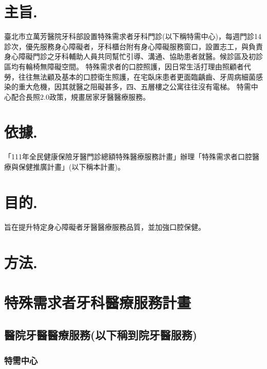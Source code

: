 \section*{主旨.}
臺北市立萬芳醫院牙科部設置特殊需求者牙科門診(以下稱特需中心)，每週門診14診次，優先服務身心障礙者，牙科櫃台附有身心障礙服務窗口，設置志工，與負責身心障礙門診之牙科輔助人員共同幫忙引導、溝通、協助患者就醫。候診區及初診區均有輪椅無障礙空間。
特殊需求者的口腔照護，因日常生活打理由照顧者代勞，往往無法顧及基本的口腔衛生照護，在宅臥床患者更面臨齲齒、牙周病細菌感染的重大危機，因其就醫之阻礙甚多，四、五層樓之公寓往往沒有電梯。
特需中心配合長照2.0政策，規畫居家牙醫醫療服務。

\section*{依據.}
「111年全民健康保險牙醫門診總額特殊醫療服務計畫」辦理「特殊需求者口腔醫療與保健推廣計畫」(以下稱本計畫)。

\section*{目的.} 旨在提升特定身心障礙者牙醫醫療服務品質，並加強口腔保健。

\section*{方法.}
\section{特殊需求者牙科醫療服務計畫}

\subsection{醫院牙醫醫療服務(以下稱到院牙醫服務)}
\label{dent}

\subsubsection{特需中心}

